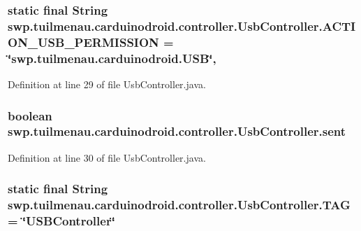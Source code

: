\subsubsection[{A\+C\+T\+I\+O\+N\+\_\+\+U\+S\+B\+\_\+\+P\+E\+R\+M\+I\+S\+S\+I\+O\+N}]{\setlength{\rightskip}{0pt plus 5cm}static final String swp.\+tuilmenau.\+carduinodroid.\+controller.\+Usb\+Controller.\+A\+C\+T\+I\+O\+N\+\_\+\+U\+S\+B\+\_\+\+P\+E\+R\+M\+I\+S\+S\+I\+O\+N = \char`\"{}swp.\+tuilmenau.\+carduinodroid.\+U\+S\+B\char`\"{}\hspace{0.3cm}{\ttfamily [static]}, {\ttfamily [protected]}}\label{classswp_1_1tuilmenau_1_1carduinodroid_1_1controller_1_1_usb_controller_a6b5f3ff9713306bec517ee3364dfd06a}


Definition at line 29 of file Usb\+Controller.\+java.

\hypertarget{classswp_1_1tuilmenau_1_1carduinodroid_1_1controller_1_1_usb_controller_a3dec7c34ddb753bf6bb81aa1d84f3c5d}{}
\subsubsection[{sent}]{\setlength{\rightskip}{0pt plus 5cm}boolean swp.\+tuilmenau.\+carduinodroid.\+controller.\+Usb\+Controller.\+sent}\label{classswp_1_1tuilmenau_1_1carduinodroid_1_1controller_1_1_usb_controller_a3dec7c34ddb753bf6bb81aa1d84f3c5d}


Definition at line 30 of file Usb\+Controller.\+java.

\hypertarget{classswp_1_1tuilmenau_1_1carduinodroid_1_1controller_1_1_usb_controller_ac6cbc77f36172b703ce0ea61a5d6f976}{}
\subsubsection[{T\+A\+G}]{\setlength{\rightskip}{0pt plus 5cm}static final String swp.\+tuilmenau.\+carduinodroid.\+controller.\+Usb\+Controller.\+T\+A\+G = \char`\"{}U\+S\+B\+Controller\char`\"{}\hspace{0.3cm}{\ttfamily [static]}}\label{classswp_1_1tuilmenau_1_1carduinodroid_1_1controller_1_1_usb_controller_ac6cbc77f36172b703ce0ea61a5d6f976}


